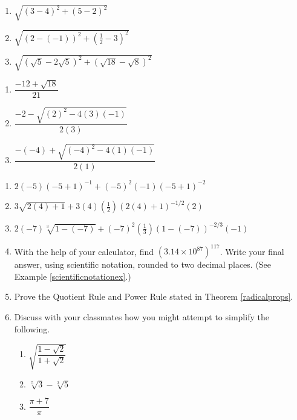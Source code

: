 \begin{multicols}{3}
\begin{enumerate}
\setcounter{enumi}{\value{HW}}

\item  $\sqrt{(3-4)^2 + (5-2)^2}$
\item  $\sqrt{(2 - (-1))^2 + \left(\frac{1}{2} - 3\right)^2}$ 
\item  $\sqrt{(\sqrt{5} - 2\sqrt{5})^2 + (\sqrt{18} - \sqrt{8})^2}$

\setcounter{HW}{\value{enumi}}
\end{enumerate}
\end{multicols}

\begin{multicols}{3}
\begin{enumerate}
\setcounter{enumi}{\value{HW}}

\item  $\dfrac{-12 + \sqrt{18}}{21}$
\item  $\dfrac{-2 - \sqrt{(2)^2 - 4(3)(-1)}}{2(3)}$  
\item  $\dfrac{-(-4) + \sqrt{(-4)^2 - 4(1)(-1)}}{2(1)}$

\setcounter{HW}{\value{enumi}}
\end{enumerate}
\end{multicols}

\begin{enumerate}
\setcounter{enumi}{\value{HW}}

\item $2(-5)(-5+1)^{-1} + (-5)^2(-1)(-5+1)^{-2}$
\item $3\sqrt{2(4)+1} + 3(4)\left(\frac{1}{2}\right)(2(4)+1)^{-1/2}(2)$
\item $2(-7)\sqrt[3]{1-(-7)} + (-7)^2 \left(\frac{1}{3}\right)(1-(-7))^{-2/3}(-1)$ \label{arithexlast}

\item With the help of your calculator, find $(3.14 \times 10^{87})^{117}$.  Write your final answer, using scientific notation, rounded to two decimal places. (See Example \ref{scientificnotationex}.)

\item Prove the Quotient Rule and Power Rule stated in Theorem \ref{radicalprops}.

\item Discuss with your classmates how you might attempt to simplify the following.

\begin{enumerate}

\item $\sqrt{\dfrac{1 - \sqrt{2}}{1 + \sqrt{2}}}$

\item $\sqrt[5]{3} - \sqrt[3]{5}$

\item $\dfrac{\pi + 7}{\pi}$

\end{enumerate}

\end{enumerate}


